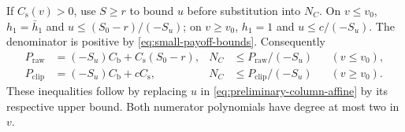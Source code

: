\documentclass[11pt]{article}
\theoremstyle{remark}
\theoremstyle{plain}
\begin{document}
If $C_{\mathrm s}(v)>0$, use $S\ge r$ to bound $u$ before
substitution into $N_C$. On $v\le v_0$, $h_1=\bar h_1$ and
$u\le(S_0-r)/(-S_u)$; on $v\ge v_0$, $h_1=1$ and
$u\le c/(-S_u)$. The denominator is positive by
\eqref{eq:small-payoff-bounds}. Consequently
\begin{equation}
 \begin{aligned}
 P_{\mathrm{raw}}&=(-S_u)C_{\mathrm b}+C_{\mathrm s}(S_0-r),
 &N_C&\le P_{\mathrm{raw}}/(-S_u)&& (v\le v_0),\\
 P_{\mathrm{clip}}&=(-S_u)C_{\mathrm b}+cC_{\mathrm s},
 &N_C&\le P_{\mathrm{clip}}/(-S_u)&& (v\ge v_0).
 \end{aligned}
 \label{eq:preliminary-column-substitution}
\end{equation}
These inequalities follow by replacing $u$ in
\eqref{eq:preliminary-column-affine} by its respective upper bound.
Both numerator polynomials have degree at most two in $v$.
\end{document}
